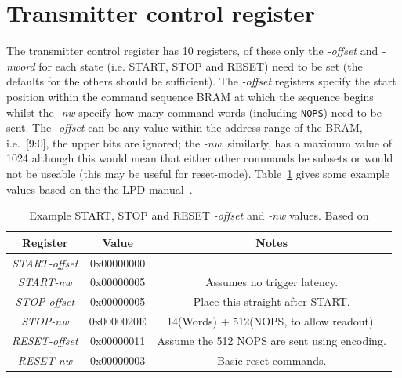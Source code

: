     \section{Transmitter control register} %
    \label{sub:basic_transmitter_control_register}
    The transmitter control register has 10 registers, of these only the \emph{-offset} and \emph{-nword} for each state (i.e. START, STOP and RESET) need to be set (the defaults for the others should be sufficient). The \emph{-offset} registers specify the start position within the command sequence BRAM at which the sequence begins whilst the \emph{-nw} specify how many command words (including \texttt{NOPS}) need to be sent. The \emph{-offset} can be any value within the address range of the BRAM, i.e.\ [9:0], the upper bits are ignored; the \emph{-nw}, similarly, has a maximum value of 1024 although this would mean that either other commands be subsets or would not be useable (this may be useful for reset-mode). Table~\ref{tab:basic_tx_control_reg} gives some example values based on the the LPD manual~\cite{lpd_manual}.
    
    \begin{table}
        \begin{center}
        \begin{tabular}{c | c | c}
            Register            & Value      & Notes                                       \\
            \hline
            \emph{START-offset} & 0x00000000 &                                             \\
            \emph{START-nw} & 0x00000005 & Assumes no trigger latency.                 \\
            \emph{STOP-offset}  & 0x00000005 & Place this straight after START.            \\
            \emph{STOP-nw}  & 0x0000020E & 14(Words) + 512(NOPS, to allow readout).    \\
            \emph{RESET-offset} & 0x00000011 & Assume the 512 NOPS are sent using encoding.\\
            \emph{RESET-nw} & 0x00000003 & Basic reset commands.                       \\
        \end{tabular}
        \end{center}
        \caption{Example START, STOP and RESET \emph{-offset} and \emph{-nw} values. Based on \cite{lpd_manual}}
        \label{tab:basic_tx_control_reg}
    \end{table}

